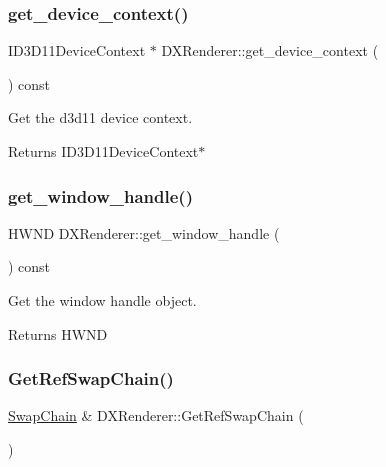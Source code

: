 \subsubsection{\texorpdfstring{get\+\_\+device\+\_\+context()}{get\_device\_context()}}
{\footnotesize\ttfamily I\+D3\+D11\+Device\+Context $\ast$ D\+X\+Renderer\+::get\+\_\+device\+\_\+context (\begin{DoxyParamCaption}{ }\end{DoxyParamCaption}) const}



Get the d3d11 device context. 

\begin{DoxyReturn}{Returns}
I\+D3\+D11\+Device\+Context$\ast$ 
\end{DoxyReturn}
\mbox{\label{classDXRenderer_a42ba6c03505ed59104538abfcd554d15}} 
\subsubsection{\texorpdfstring{get\+\_\+window\+\_\+handle()}{get\_window\_handle()}}
{\footnotesize\ttfamily H\+W\+ND D\+X\+Renderer\+::get\+\_\+window\+\_\+handle (\begin{DoxyParamCaption}{ }\end{DoxyParamCaption}) const}



Get the window handle object. 

\begin{DoxyReturn}{Returns}
H\+W\+ND 
\end{DoxyReturn}
\mbox{\label{classDXRenderer_ab75c4ead239b0c31ff8b0b6d826d35af}} 
\subsubsection{\texorpdfstring{Get\+Ref\+Swap\+Chain()}{GetRefSwapChain()}\hspace{0.1cm}{\footnotesize\ttfamily [1/2]}}
{\footnotesize\ttfamily \hyperlink{structSwapChain}{Swap\+Chain} \& D\+X\+Renderer\+::\+Get\+Ref\+Swap\+Chain (\begin{DoxyParamCaption}{ }\end{DoxyParamCaption})}



